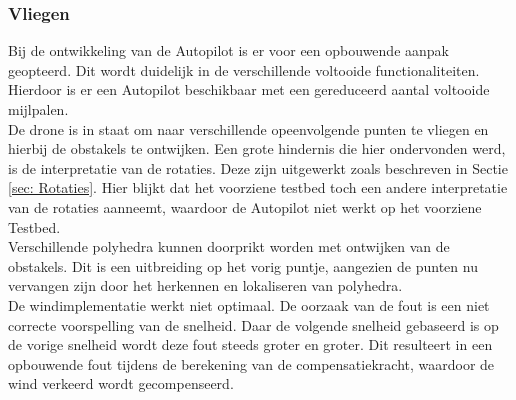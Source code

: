 \subsubsection{Vliegen}
Bij de ontwikkeling van de Autopilot is er voor een opbouwende aanpak geopteerd. Dit wordt duidelijk in de verschillende voltooide functionaliteiten. Hierdoor is er een Autopilot beschikbaar met een gereduceerd aantal voltooide mijlpalen.\\
De drone is in staat om naar verschillende opeenvolgende punten te vliegen en hierbij de obstakels te ontwijken. Een grote hindernis die hier ondervonden werd, is de interpretatie van de rotaties. Deze zijn uitgewerkt zoals beschreven in Sectie \ref{sec: Rotaties}. Hier blijkt dat het voorziene testbed toch een andere interpretatie van de rotaties aanneemt, waardoor de Autopilot niet werkt op het voorziene Testbed.\\
Verschillende polyhedra kunnen doorprikt worden met ontwijken van de obstakels. Dit is een uitbreiding op het vorig puntje, aangezien de punten nu vervangen zijn door het herkennen en lokaliseren van polyhedra. \\
De windimplementatie werkt niet optimaal. De oorzaak van de fout is een niet correcte voorspelling van de snelheid. Daar de volgende snelheid gebaseerd is op de vorige snelheid wordt deze fout steeds groter en groter. Dit resulteert in een opbouwende fout tijdens de berekening van de compensatiekracht, waardoor de wind verkeerd wordt gecompenseerd. 

